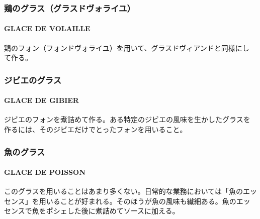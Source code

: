 \begin{recette}
\maeaki

\hypertarget{ux9d8fux306eux30b0ux30e9ux30b9ux30b0ux30e9ux30b9ux30c9ux30f4ux30a9ux30e9ux30a4ux30e6}{%
\subsubsection{鶏のグラス（グラスドヴォライユ）}\label{ux9d8fux306eux30b0ux30e9ux30b9ux30b0ux30e9ux30b9ux30c9ux30f4ux30a9ux30e9ux30a4ux30e6}}

\hypertarget{glace-de-volaille}{%
\paragraph{GLACE DE VOLAILLE}\label{glace-de-volaille}}


鶏のフォン（フォンドヴォライユ）を用いて、グラスドヴィアンドと同様にし
て作る。

\maeaki

\hypertarget{ux30b8ux30d3ux30a8ux306eux30b0ux30e9ux30b9}{%
\subsubsection{ジビエのグラス}\label{ux30b8ux30d3ux30a8ux306eux30b0ux30e9ux30b9}}

\hypertarget{glace-de-gibier}{%
\paragraph{GLACE DE GIBIER}\label{glace-de-gibier}}


ジビエのフォンを煮詰めて作る。ある特定のジビエの風味を生かしたグラスを
作るには、そのジビエだけでとったフォンを用いること。

\maeaki

\hypertarget{ux9b5aux306eux30b0ux30e9ux30b9}{%
\subsubsection{魚のグラス}\label{ux9b5aux306eux30b0ux30e9ux30b9}}

\hypertarget{glace-de-poisson}{%
\paragraph{GLACE DE POISSON}\label{glace-de-poisson}}


このグラスを用いることはあまり多くない。日常的な業務においては「魚のエッ
センス」を用いることが好まれる。そのほうが魚の風味も繊細ある。魚のエッ
センスで魚をポシェした後に煮詰めてソースに加える。
\end{recette}

